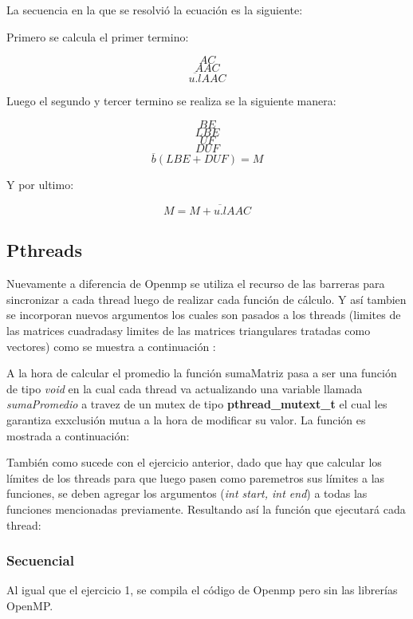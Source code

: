 
La secuencia en la que se resolvió la ecuación es la siguiente:

Primero se calcula el primer termino:

$$ AC $$
$$ AAC $$
$$ \overline{u.l}AAC $$

Luego el segundo y tercer termino se realiza se la siguiente manera:

$$ BE $$
$$ LBE $$
$$ UF $$
$$ DUF $$
$$\overline{b}(LBE + DUF) = M$$

Y por ultimo:

$$ M = M + \overline{u.l}AAC $$

\subsection{Pthreads}

Nuevamente a diferencia de Openmp se utiliza el recurso de las barreras para sincronizar a cada thread luego de realizar cada función de cálculo. Y así tambien se incorporan nuevos argumentos los cuales son pasados a los threads (limites de las matrices cuadradasy limites de las matrices triangulares tratadas como vectores) como se muestra a continuación :


A la hora de calcular el promedio la función sumaMatriz pasa a ser una función de tipo \textit{void} en la cual cada thread va actualizando una variable llamada \textit{sumaPromedio} a travez de un mutex de tipo \textbf{pthread\_mutext\_t} el cual les garantiza exxclusión mutua a la hora de modificar su valor. La función es mostrada a continuación:


También como sucede con el ejercicio anterior, dado que hay que calcular los límites de los threads para que luego pasen como paremetros sus límites a las funciones, se deben agregar los argumentos (\textit{int start, int end}) a todas las funciones mencionadas previamente. Resultando así la función que ejecutará cada thread:


\subsubsection{Secuencial}

Al igual que el ejercicio 1, se compila el código de Openmp pero sin las librerías OpenMP.